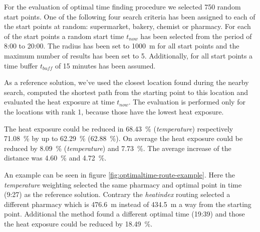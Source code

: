For the evaluation of optimal time finding procedure we selected 750 random start points. One of the following four search criteria has been assigned to each of the start points at random: supermarket, bakery, chemist or pharmacy. For each of the start points a random start time $t_{now}$ has been selected from the period of 8:00 to 20:00. The radius has been set to \SI{1000}{\meter} for all start points and the maximum number of results has been set to 5. Additionally, for all start points a time buffer $t_{buff}$ of 15 minutes has been assumed. 

As a reference solution, we've used the closest location found during the nearby search, computed the shortest path from the starting point to this location and evaluated the heat exposure at time $t_{now}$. The evaluation is performed only for the locations with rank 1, because those have the lowest heat exposure.

The heat exposure could be reduced in \SI{68.43}{\percent} (\emph{temperature}) respectively \SI{71.08}{\percent} by up to \SI{62.29}{\percent} (\SI{62.88}{\percent}). On average the heat exposure could be reduced by \SI{8.09}{\percent} (\emph{temperature}) and \SI{7.73}{\percent}. The average increase of the distance was \SI{4.60}{\percent} and \SI{4.72}{\percent}.

An example can be seen in figure \ref{fig:optimaltime-route-example}. 
Here the \emph{temperature} weighting selected the same pharmacy and optimal point in time (9:27) as the reference solution. Contrary the \emph{heatindex} routing selected a different pharmacy which is \SI{476.6}{\meter} instead of  \SI{434.5}{\meter} a way from the starting point. Additional the method found a different optimal time (19:39) and those the heat exposure could be reduced by \SI{18.49}{\percent}.  
 
